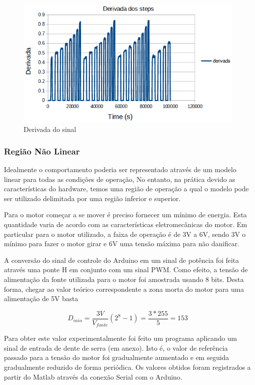 \documentclass[a4paper,11pt]{article}
\begin{document}
\begin{figure}[H]
    \centering
    \includegraphics[width=\linewidth]{src/tex/img/derivada_steps.PNG} 
    \caption{Derivada do sinal}
    \label{fig:sinal8bits}
\end{figure}

\subsubsection{Região Não Linear}

Idealmente o comportamento poderia ser representado através de um modelo linear para todas as condições de operação, No entanto, na prática devido as características do hardware, temos uma região de operação a qual o modelo pode ser utilizado delimitada por uma região inferior e superior.

Para o motor começar a se mover é preciso fornecer um mínimo de energia. Esta quantidade varia de acordo com as características eletromecânicas do motor. Em particular para o motor utilizado, a faixa de operação é de 3V a 6V, sendo 3V o mínimo para fazer o motor girar e 6V uma tensão máxima para não danificar.

A conversão do sinal de controle do Arduino em um sinal de potência foi feita através uma ponte H em conjunto com um sinal PWM. Como efeito, a tensão de alimentação da fonte utilizada para o motor foi amostrada usando 8 bits. Desta forma, chegar ao valor teórico correspondente a zona morta do motor para uma alimentação de 5V basta 

$$
D_{min} = \frac{3V}{V_{fonte}}(2^8 -1) = \frac{3*255}{5} = 153
$$

Para obter este valor experimentalmente foi feito um programa aplicando um sinal de entrada de dente de serra (em anexo). Isto é, o valor de referência passado para a tensão do motor foi gradualmente aumentado e em seguida gradualmente reduzido de forma periódica. Os valores obtidos foram registrados a partir do Matlab através da conexão Serial com o Arduino.
\end{document}
